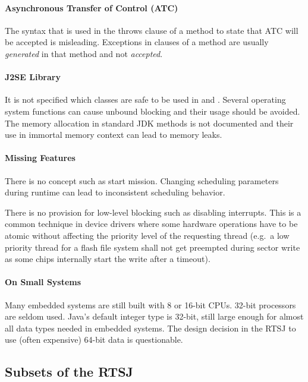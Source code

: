 \paragraph{Asynchronous Transfer of Control (ATC)}

The syntax that is used in the throws clause of a method to state
that ATC will be accepted is misleading. Exceptions in 
clauses of a method are usually \emph{generated} in that method and
not \textit{accepted}.

\paragraph{J2SE Library}

It is not specified which classes are safe to be used in
\linebreak[4] and .
Several operating system functions can cause unbound blocking and
their usage should be avoided. The memory allocation in standard JDK
methods is not documented and their use in immortal memory context
can lead to memory leaks.

\paragraph{Missing Features}

There is no concept such as start mission. Changing scheduling
parameters during runtime can lead to inconsistent scheduling
behavior.

There is no provision for low-level blocking such as disabling
interrupts. This is a common technique in device drivers where some
hardware operations have to be atomic without affecting the priority
level of the requesting thread (e.g.\ a low priority thread for a
flash file system shall not get preempted during sector write as
some chips internally start the write after a timeout).

\paragraph{On Small Systems}

Many embedded systems are still built with 8 or 16-bit CPUs. 32-bit
processors are seldom used. Java's default integer type is 32-bit,
still large enough for almost all data types needed in embedded
systems. The design decision in the RTSJ to use (often expensive)
64-bit  data is questionable.

\subsection{Subsets of the RTSJ}
\label{subsec:restr:rtsj}

